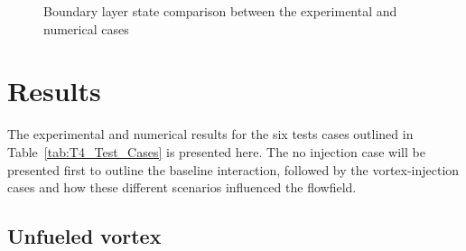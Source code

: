 \documentclass{AIAA}
\begin{document}
\begin{figure}[!h]
\center
{}
\caption{Boundary layer state comparison between the experimental and numerical cases}
\label{fig:Num_Exp_BLcompar}
\end{figure} 



\section{Results}

The experimental and numerical results for the six tests cases outlined in Table~\ref{tab:T4_Test_Cases} is presented here.
The no injection case will be presented first to outline the baseline interaction, followed by the vortex-injection cases and how these different scenarios influenced the flowfield.

\subsection{Unfueled vortex}
\end{document}
